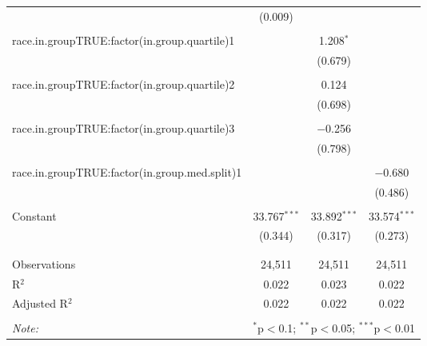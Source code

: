 \begin{table}[!htbp]
\begin{tabular}{@{\extracolsep{5pt}}lccc}
  & (0.009) &  &  \\ 
  & & & \\ 
 race.in.groupTRUE:factor(in.group.quartile)1 &  & 1.208$^{*}$ &  \\ 
  &  & (0.679) &  \\ 
  & & & \\ 
 race.in.groupTRUE:factor(in.group.quartile)2 &  & 0.124 &  \\ 
  &  & (0.698) &  \\ 
  & & & \\ 
 race.in.groupTRUE:factor(in.group.quartile)3 &  & $-$0.256 &  \\ 
  &  & (0.798) &  \\ 
  & & & \\ 
 race.in.groupTRUE:factor(in.group.med.split)1 &  &  & $-$0.680 \\ 
  &  &  & (0.486) \\ 
  & & & \\ 
 Constant & 33.767$^{***}$ & 33.892$^{***}$ & 33.574$^{***}$ \\ 
  & (0.344) & (0.317) & (0.273) \\ 
  & & & \\ 
\hline \\[-1.8ex] 
Observations & 24,511 & 24,511 & 24,511 \\ 
R$^{2}$ & 0.022 & 0.023 & 0.022 \\ 
Adjusted R$^{2}$ & 0.022 & 0.022 & 0.022 \\ 
\hline 
\hline \\[-1.8ex] 
\textit{Note:}  & \multicolumn{3}{r}{$^{*}$p$<$0.1; $^{**}$p$<$0.05; $^{***}$p$<$0.01} \\ 
\end{tabular} 
\end{table} 
